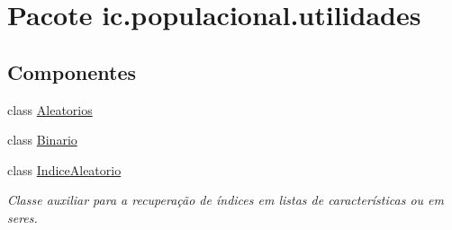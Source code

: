 \hypertarget{namespaceic_1_1populacional_1_1utilidades}{\section{Pacote ic.\-populacional.\-utilidades}
\label{namespaceic_1_1populacional_1_1utilidades}
}
\subsection*{Componentes}
\begin{DoxyCompactItemize}
\item 
class \hyperlink{classic_1_1populacional_1_1utilidades_1_1_aleatorios}{Aleatorios}
\item 
class \hyperlink{classic_1_1populacional_1_1utilidades_1_1_binario}{Binario}
\item 
class \hyperlink{classic_1_1populacional_1_1utilidades_1_1_indice_aleatorio}{Indice\-Aleatorio}
\begin{DoxyCompactList}\small\item\em Classe auxiliar para a recuperação de índices em listas de características ou em seres. \end{DoxyCompactList}\end{DoxyCompactItemize}
